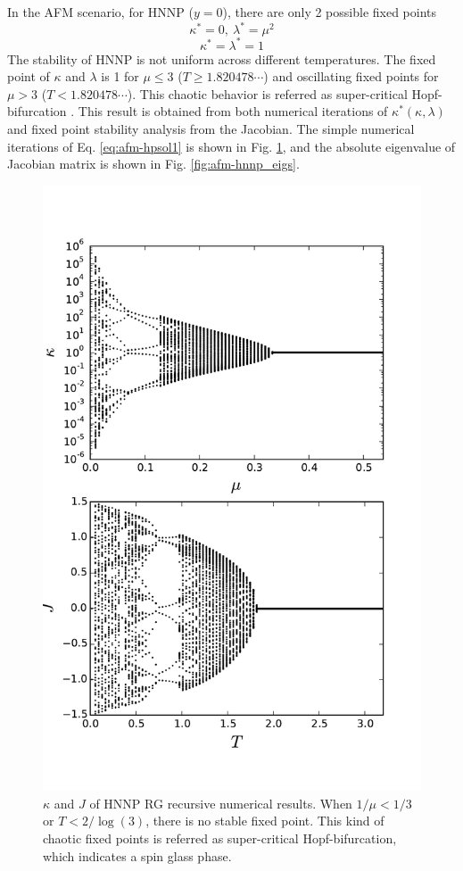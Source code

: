 In the AFM scenario, for HNNP ($y = 0$), there are only 2 possible fixed points 
\begin{equation}
\kappa^* = 0, \ \lambda^* = \mu^2 
\end{equation} 
\begin{equation}
\kappa^* = \lambda^* = 1 
\end{equation} 
 The stability of HNNP is not uniform across different temperatures. The fixed point of $\kappa$ and $\lambda$ is 1 for $\mu \le 3$ ($T\ge1.820478\cdots$) and oscillating fixed points for $\mu > 3$ ($T<1.820478\cdots$). This chaotic behavior is referred as super-critical Hopf-bifurcation  \cite{weinrib1983critical}. This result is obtained from both numerical iterations of $\kappa^*(\kappa, \lambda)$ and fixed point stability analysis from the Jacobian.
The simple numerical iterations of Eq. \ref{eq:afm-hpsol1} is shown in Fig. \ref{fig:afm-hnnpkappa}, and the absolute eigenvalue of Jacobian matrix is shown in Fig. \ref{fig:afm-hnnp_eigs}.
\begin{figure}
\centering \includegraphics[width=0.6\columnwidth]{Chapter-3/HNNP_RG_Kvsmu_JvsT.pdf}
\protect\caption{ $\kappa$ and $J$ of HNNP RG recursive numerical results. When $1/\mu < 1/3$ or $T < 2/\log(3)$, there is no stable fixed point. This kind of chaotic fixed points is referred as super-critical Hopf-bifurcation, which indicates a spin glass phase.}
\label{fig:afm-hnnpkappa} 
\end{figure}


